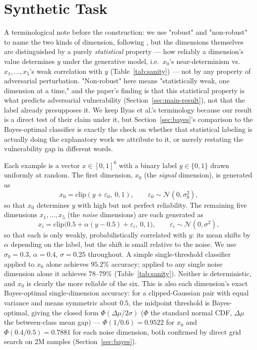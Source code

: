 \documentclass[11pt]{article}
\begin{document}
\section{Synthetic Task}
\label{sec:task}

A terminological note before the construction: we use "robust" and
"non-robust" to name the two kinds of dimension, following
\cite{ilyas2019}, but the dimensions themselves are distinguished by a
purely \emph{statistical} property --- how reliably a dimension's value
determines $y$ under the generative model, i.e.\ $x_0$'s near-determinism
vs.\ $x_1,\ldots,x_5$'s weak correlation with $y$ (Table~\ref{tab:sanity})
--- not by any property of adversarial perturbation. "Non-robust" here
means "statistically weak, one dimension at a time," and the paper's
finding is that this statistical property is what predicts adversarial
vulnerability (Section~\ref{sec:main-result}), not that the label already
presupposes it. We keep Ilyas et al.'s terminology because our result is
a direct test of their claim under it, but Section~\ref{sec:bayes}'s
comparison to the Bayes-optimal classifier is exactly the check on whether
that statistical labeling is actually doing the explanatory work we
attribute to it, or merely restating the vulnerability gap in different
words.

Each example is a vector $x \in [0,1]^6$ with a binary label $y \in \{0,1\}$
drawn uniformly at random. The first dimension, $x_0$ (the \emph{signal}
dimension), is generated as
\[
x_0 = \mathrm{clip}(y + \varepsilon_0,\ 0, 1), \qquad \varepsilon_0 \sim
\mathcal N(0, \sigma_0^2),
\]
so that $x_0$ determines $y$ with high but not perfect reliability. The
remaining five dimensions $x_1,\dots,x_5$ (the \emph{noise} dimensions) are
each generated as
\[
x_i = \mathrm{clip}\big(0.5 + \alpha (y - 0.5) + \varepsilon_i,\ 0,
1\big), \qquad \varepsilon_i \sim \mathcal N(0, \sigma^2),
\]
so that each is only weakly, probabilistically correlated with $y$: its
mean shifts by $\alpha$ depending on the label, but the shift is small
relative to the noise. We use $\sigma_0 = 0.3$, $\alpha = 0.4$, $\sigma =
0.25$ throughout. A simple single-threshold classifier applied to $x_0$
alone achieves $95.2\%$ accuracy; applied to any single noise dimension
alone it achieves $78$--$79\%$ (Table~\ref{tab:sanity}). Neither is
deterministic, and $x_0$ is clearly the more reliable of the six. This is
also each dimension's exact Bayes-optimal single-dimension accuracy: for a
clipped-Gaussian pair with equal variance and means symmetric about $0.5$,
the midpoint threshold is Bayes-optimal, giving the closed form
$\Phi(\Delta\mu/2\sigma)$ ($\Phi$ the standard normal CDF, $\Delta\mu$ the
between-class mean gap) --- $\Phi(1/0.6)=0.9522$ for $x_0$ and
$\Phi(0.4/0.5)=0.7881$ for each noise dimension, both confirmed by direct
grid search on 2M samples (Section~\ref{sec:bayes}).
\end{document}
